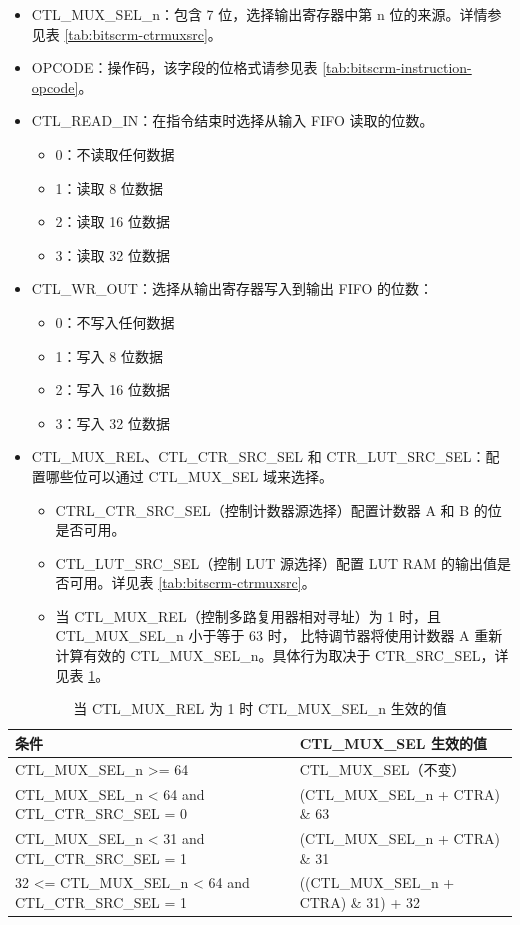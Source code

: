 \documentclass[main\_\_CN.tex]{subfiles}
\begin{document}
\begin{itemize}
\item CTL\_MUX\_SEL\_n：包含 7 位，选择输出寄存器中第 n 位的来源。详情参见表 \ref{tab:bitscrm-ctrmuxsrc}。
\item OPCODE：操作码，该字段的位格式请参见表 \ref{tab:bitscrm-instruction-opcode}。
\item CTL\_READ\_IN：在指令结束时选择从输入 FIFO 读取的位数。

\begin{itemize}
\item 0：不读取任何数据
\item 1：读取 8 位数据
\item 2：读取 16 位数据
\item 3：读取 32 位数据
\end{itemize}

\item CTL\_WR\_OUT：选择从输出寄存器写入到输出 FIFO 的位数：

\begin{itemize}
\item 0：不写入任何数据
\item 1：写入 8 位数据
\item 2：写入 16 位数据
\item 3：写入 32 位数据
\end{itemize}

\item CTL\_MUX\_REL、CTL\_CTR\_SRC\_SEL 和 CTR\_LUT\_SRC\_SEL：配置哪些位可以通过 CTL\_MUX\_SEL 域来选择。

\begin{itemize}
    \item CTRL\_CTR\_SRC\_SEL（控制计数器源选择）配置计数器 A 和 B 的位是否可用。
    \item CTL\_LUT\_SRC\_SEL（控制 LUT 源选择）配置 LUT RAM 的输出值是否可用。详见表 \ref{tab:bitscrm-ctrmuxsrc}。
    \item 当 CTL\_MUX\_REL（控制多路复用器相对寻址）为 1 时，且 CTL\_MUX\_SEL\_n 小于等于 63 时， 比特调节器将使用计数器 A 重新计算有效的 CTL\_MUX\_SEL\_n。具体行为取决于 CTR\_SRC\_SEL，详见表 \ref{tab:bitscrm-ctrmuxrel}。
\end{itemize}

\end{itemize}


\begin{table}[H]
\centering
\caption{当 CTL\_MUX\_REL 为 1 时 CTL\_MUX\_SEL\_n 生效的值}
\label{tab:bitscrm-ctrmuxrel}
\begin{tabular}{|l|l|}
\hline\rowcolor{lightgray}
条件 & CTL\_MUX\_SEL 生效的值\\
\hline
CTL\_MUX\_SEL\_n >= 64 & CTL\_MUX\_SEL（不变） \\
CTL\_MUX\_SEL\_n < 64 and CTL\_CTR\_SRC\_SEL = 0 & (CTL\_MUX\_SEL\_n + CTRA) \& 63 \\
CTL\_MUX\_SEL\_n < 31 and CTL\_CTR\_SRC\_SEL = 1 & (CTL\_MUX\_SEL\_n + CTRA) \& 31 \\
32 <= CTL\_MUX\_SEL\_n < 64 and CTL\_CTR\_SRC\_SEL = 1 & ((CTL\_MUX\_SEL\_n + CTRA) \& 31) + 32 \\
\hline
\end{tabular}
\end{table}
\end{document}
